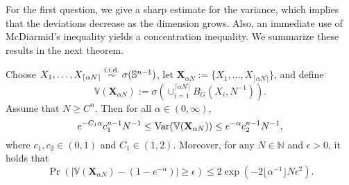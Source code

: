 For the first question, we  give a sharp estimate for the variance, which implies that the deviations decrease as the dimension grows. Also, an immediate use of McDiarmid's inequality yields a concentration inequality. We summarize these results in the next theorem.
\begin{theorem}\label{partialthm}
	Choose $X_1,\ldots,X_{\lceil \alpha N \rceil} \stackrel{\text{i.i.d.}}{\sim} \sigma(\mathbb{S}^{n-1})$,  let $\mathbf{X}_{\alpha N}:=\{X_1,\ldots,X_{\lceil \alpha N \rceil}\}$, and define 
\[
\mathbb{V}(\mathbf{X}_{\alpha N}) :=  \sigma(\cup_{i=1}^{\lceil \alpha N \rceil}B_G(X_i,N^{-1})).
\]
	Assume that $ N \geq C^{n}$. Then for all $\alpha \in (0,\infty)$,
	 \[
	 	e^{-C_1\alpha} c_1^{n-1}N^{-1} \leq \operatorname{Var}(\mathbb{V}(\mathbf{X}_{\alpha N})) \leq e^{-\alpha} c_2^{n-1}N^{-1},
	 \]
	  where $c_1,c_2 \in (0,1)$ and $C_1 \in (1,2)$. Moreover, for any $ N \in \mathbb{N}$ and $\epsilon>0$, it holds that 
	 \[
	 	\Pr(|\mathbb{V}(\mathbf{X}_{\alpha N}) - (1-e^{-\alpha})| \geq \epsilon) \leq 2\exp\left(-2\lfloor\alpha^{-1}\rfloor N\epsilon^2\right).
	 \]
\end{theorem}

